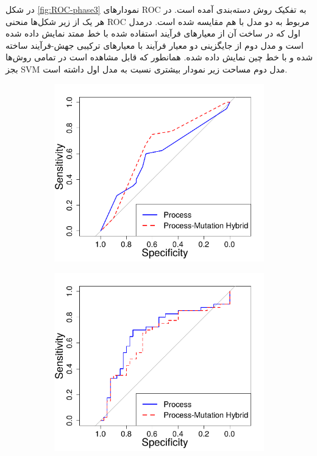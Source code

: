 در شکل \ref{fig:ROC-phase3} نمودارهای ROC به تفکیک روش دسته‌بندی آمده است. در هر یک از زیر شکل‌ها منحنی ROC مربوط به  دو مدل با هم مقایسه شده است. درمدل اول که در ساخت آن از معیارهای فرآیند استفاده شده  با خط ممتد نمایش داده شده است و مدل دوم  از جایگزینی دو معیار فرآیند با معیارهای ترکیبی جهش-فرآیند ساخته شده و با خط چین نمایش داده شده‌. همانطور که قابل مشاهده است در تمامی روش‌ها بجز  SVM مدل‌ دوم مساحت زیر نمودار بیشتری نسبت به مدل اول داشته است.
\begin{figure}[H]
	\begin{subfigure}{.5\textwidth}
		\centering
		\includegraphics[width=\linewidth]{img/evaluation/phase3-roc-dt.pdf}
		\caption{}
	\end{subfigure}
	\begin{subfigure}{.5\textwidth}
		\centering
		\includegraphics[width=\linewidth]{img/evaluation/phase3-roc-svm.pdf}

\end{subfigure}
\end{figure}
